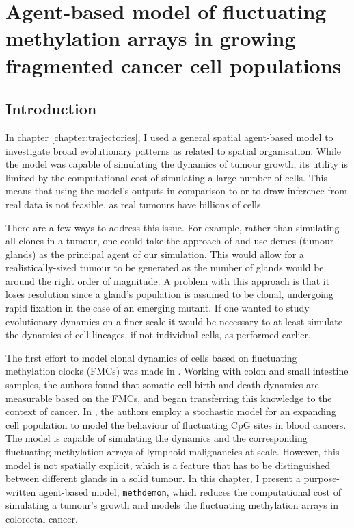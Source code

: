 \chapter{Agent-based model of fluctuating methylation arrays in growing
fragmented cancer cell populations}
\label{chapter:methdemon}


\section{Introduction}
In chapter \ref{chapter:trajectories}, I used a general spatial agent-based
model to investigate broad evolutionary patterns as related to spatial
organisation. While the model was capable of simulating the dynamics of tumour
growth, its utility is limited by the computational cost of simulating a large
number of cells. This means that using the model's outputs in comparison to or
to draw inference from real data is not feasible, as real tumours have billions
of cells. \par
There are a few ways to address this issue. For example, rather than simulating
all clones in a tumour, one could take the approach of
\cite{sottoriva_big_2015} and use demes (tumour glands) as the principal agent
of our simulation. This would allow for a realistically-sized tumour to be
generated as the number of glands would be around the right order of magnitude.
A problem with this approach is that it loses resolution since a gland's
population is assumed to be clonal, undergoing rapid fixation in the case of an
emerging mutant. If one wanted to study evolutionary dynamics on a finer scale
it would be necessary to at least simulate the dynamics of cell lineages, if
not individual cells, as performed earlier. \par
The first effort to model clonal dynamics of cells based on fluctuating
methylation clocks (FMCs) was made in \cite{gabbutt_fluctuating_2022}. Working
with colon and small intestine samples, the authors found that somatic cell
birth and death dynamics are measurable based on the FMCs, and began
transferring this knowledge to the context of cancer. In
\cite{gabbutt_evolutionary_2023}, the authors employ a stochastic model for an
expanding cell population to model the behaviour of fluctuating CpG sites in
blood cancers. The model is capable of simulating the dynamics and the
corresponding fluctuating methylation arrays of lymphoid malignancies at scale.
However, this model is not spatially explicit, which is a feature that has to
be distinguished between different glands in a solid tumour. In this chapter, I
present a purpose-written agent-based model, \texttt{methdemon}, which reduces
the computational cost of simulating a tumour's growth and models the
fluctuating methylation arrays in colorectal cancer.


